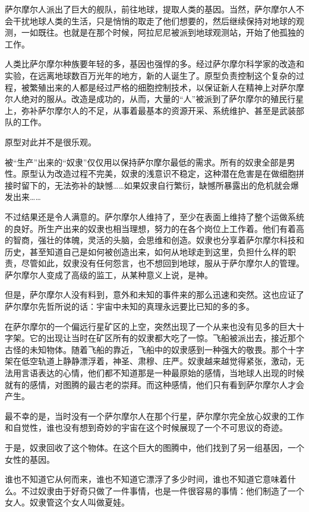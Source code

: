 萨尔摩尔人派出了巨大的舰队，前往地球，提取人类的基因。当然，萨尔摩尔人不会干扰地球人类的生活，只是悄悄的取走了他们想要的，然后继续保持对地球的观测，一如既往。也就是在那个时候，阿拉尼尼被派到地球观测站，开始了他孤独的工作。

人类比萨尔摩尔种族要年轻的多，基因也强悍的多。经过萨尔摩尔科学家的改造和实验，在远离地球数百万光年的地方，新的人诞生了。原型负责控制这个复杂的过程，被繁殖出来的人都是经过严格的细胞控制技术，以保证新人在精神上对萨尔摩尔人绝对的服从。改造是成功的，从而，大量的“人”被派到了萨尔摩尔的殖民行星上，弥补萨尔摩尔人的不足，从事着最基本的资源开采、系统维护、甚至是武装部队的工作。

原型对此并不是很乐观。

被“生产”出来的“奴隶”仅仅用以保持萨尔摩尔最低的需求。所有的奴隶全部是男性。原型认为改造过程不完美，奴隶的浅意识不稳定，这种潜在危害是在做细胞拼接时留下的，无法弥补的缺憾……如果奴隶自行繁衍，缺憾所暴露出的危机就会爆发出来……

不过结果还是令人满意的。萨尔摩尔人维持了，至少在表面上维持了整个运做系统的良好。所生产出来的奴隶也相当理想，努力的在各个岗位上工作着。他们有着高的智商，强壮的体魄，灵活的头脑，会思维和创造。奴隶也分享着萨尔摩尔科技和历史，甚至知道自己是如何被创造出来，如何从地球走到这里，负担什么样的职责，尽管如此，奴隶没有任何怨言，也不想回到地球，服从于萨尔摩尔人的管理。萨尔摩尔人变成了高级的监工，从某种意义上说，是神。

但是，萨尔摩尔人没有料到，意外和未知的事件来的那么迅速和突然。这也应证了萨尔摩尔先哲所说的话：宇宙中未知的真理永远要比已知的多的多。

在萨尔摩尔的一个偏远行星矿区的上空，突然出现了一个从来也没有见多的巨大十字架。它的出现让当时在矿区所有的奴隶都大吃了一惊。飞船被派出去，接近那个古怪的未知物体。随着飞船的靠近，飞船中的奴隶感到一种强大的敬畏。那个十字架在低空轨道上静静漂浮着，神圣、肃穆、庄严。奴隶越来越觉得紧张，激动，无法用言语表达的心情，他们都不知道那是一种最原始的感情，当地球人出现的时候就有的感情，对图腾的最古老的崇拜。而这种感情，他们只有看到萨尔摩尔人才会产生。

最不幸的是，当时没有一个萨尔摩尔人在那个行星，萨尔摩尔完全放心奴隶的工作和自觉性，谁也没有想到奇妙的宇宙在这个时候展现了一个不可思议的奇迹。

于是，奴隶回收了这个物体。在这个巨大的图腾中，他们找到了另一组基因，一个女性的基因。

谁也不知道它从何而来，谁也不知道它漂浮了多少时间，谁也不知道它意味着什么。不过奴隶由于好奇只做了一件事情，也是一件很容易的事情：他们制造了一个女人。奴隶管这个女人叫做夏娃。

